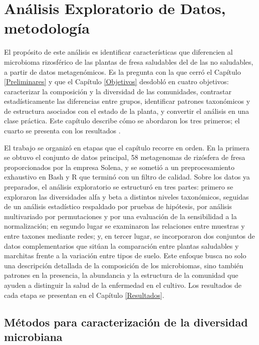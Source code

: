 \chapter[Análisis exploratorio y metodología]{Análisis Exploratorio de Datos, metodología}
\label{Metodologia}
El propósito de este análisis es identificar características que diferencien al microbioma
rizosférico de las plantas de fresa saludables del de las no saludables, a partir de datos
metagenómicos. Es la pregunta con la que cerró el Capítulo \ref{Preliminares} y que el
Capítulo \ref{Objetivos} desdobló en cuatro objetivos: caracterizar la composición y la diversidad
de las comunidades, contrastar estadísticamente las diferencias entre grupos, identificar patrones
taxonómicos y de estructura asociados con el estado de la planta, y convertir el análisis en una
clase práctica. Este capítulo describe cómo se abordaron los tres primeros; el cuarto se presenta
con los resultados \citep{yang2020comparison}.

El trabajo se organizó en etapas que el capítulo recorre en orden. En la primera se obtuvo el
conjunto de datos principal, 58 metagenomas de rizósfera de fresa proporcionados por la empresa
Solena, y se sometió a un preprocesamiento exhaustivo en Bash y R que terminó con un filtro de
calidad. Sobre los datos ya preparados, el análisis exploratorio se estructuró en tres partes:
primero se exploraron las diversidades alfa y beta a distintos niveles taxonómicos, seguidas de un
análisis estadístico respaldado por pruebas de hipótesis, por análisis multivariado por
permutaciones y por una evaluación de la sensibilidad a la normalización; en segundo lugar se
examinaron las relaciones entre muestras y entre taxones mediante redes; y, en tercer lugar, se
incorporaron dos conjuntos de datos complementarios que sitúan la comparación entre plantas
saludables y marchitas frente a la variación entre tipos de suelo. Este enfoque busca no solo una
descripción detallada de la composición de los microbiomas, sino también patrones en la presencia,
la abundancia y la estructura de la comunidad que ayuden a distinguir la salud de la enfermedad en
el cultivo. Los resultados de cada etapa se presentan en el Capítulo \ref{Resultados}.

\section[Métodos para caracterizar la diversidad]{Métodos para caracterización de la diversidad microbiana}

